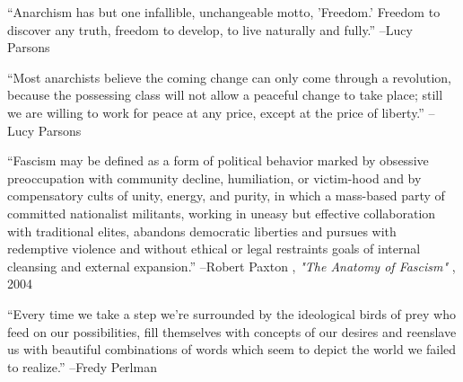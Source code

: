 \documentclass{article}%
\begin{document}
\linebreak%
\vspace{1mm}%
\begin{minipage}{\textwidth}%
\flushleft%
“Anarchism has but one infallible, unchangeable motto, 'Freedom.' Freedom to discover any truth, freedom to develop, to live naturally and fully.”%
\linebreak%
\vspace{1mm}%
–Lucy Parsons%
\linebreak%
\vspace{1mm}%
\end{minipage}%
\linebreak%
\vspace{1mm}%
\begin{minipage}{\textwidth}%
\flushleft%
“Most anarchists believe the coming change can only come through a revolution, because the possessing class will not allow a peaceful change to take place; still we are willing to work for peace at any price, except at the price of liberty.”%
\linebreak%
\vspace{1mm}%
–Lucy Parsons%
\linebreak%
\vspace{1mm}%
\end{minipage}%
\linebreak%
\vspace{1mm}%
\begin{minipage}{\textwidth}%
\flushleft%
“Fascism may be defined as a form of political behavior marked by obsessive preoccupation with community decline, humiliation, or victim{-}hood and by compensatory cults of unity, energy, and purity, in which a mass{-}based party of committed nationalist militants, working in uneasy but effective collaboration with traditional elites, abandons democratic liberties and pursues with redemptive violence and without ethical or legal restraints goals of internal cleansing and external expansion.”%
\linebreak%
\vspace{1mm}%
–Robert Paxton%
, \textit{"The Anatomy of Fascism"}%
, 2004%
\linebreak%
\vspace{1mm}%
\end{minipage}%
\linebreak%
\vspace{1mm}%
\begin{minipage}{\textwidth}%
\flushleft%
“Every time we take a step we're surrounded by the ideological birds of prey who feed on our possibilities, fill themselves with concepts of our desires and reenslave us with beautiful combinations of words which seem to depict the world we failed to realize.”%
\linebreak%
\vspace{1mm}%
–Fredy Perlman%
\linebreak%
\vspace{1mm}%
\end{minipage}%
\end{document}
